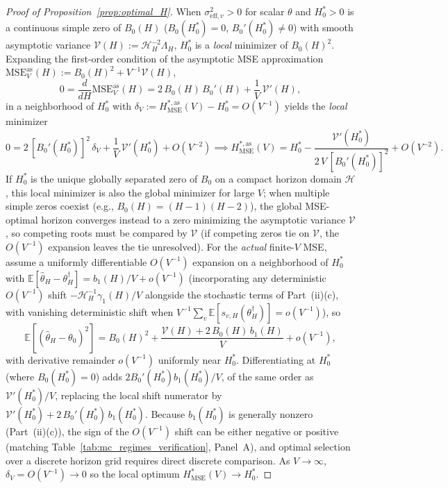 \begin{proof}[Proof of Proposition~\ref{prop:optimal_H}]
When $\sigma_{\mathrm{eff},v}^2 > 0$ for scalar $\theta$ and $H_0^\ast > 0$ is a continuous simple zero of $B_0(H)$ ($B_0(H_0^\ast) = 0$, $B_0'(H_0^\ast) \neq 0$) with smooth asymptotic variance $\mathcal{V}(H) := \mathcal{H}_H^{-2}\Lambda_H$, $H_0^\ast$ is a \emph{local} minimizer of $B_0(H)^2$. Expanding the first-order condition of the asymptotic MSE approximation $\mathrm{MSE}_V^{\mathrm{as}}(H) := B_0(H)^2 + V^{-1}\mathcal{V}(H)$,
\[
0 = \frac{d}{dH}\mathrm{MSE}_V^{\mathrm{as}}(H)
= 2\,B_0(H)\,B_0'(H) + \frac{1}{V}\,\mathcal{V}'(H),
\]
in a neighborhood of $H_0^\ast$ with $\delta_V := H_{\mathrm{MSE}}^{\ast,\mathrm{as}}(V) - H_0^\ast = O(V^{-1})$ yields the \emph{local} minimizer
\[
0 = 2\,[B_0'(H_0^\ast)]^2\,\delta_V + \frac{1}{V}\,\mathcal{V}'(H_0^\ast) + O(V^{-2})
\implies
H_{\mathrm{MSE}}^{\ast,\mathrm{as}}(V) = H_0^\ast - \frac{\mathcal{V}'(H_0^\ast)}{2\,V\,[B_0'(H_0^\ast)]^2} + O(V^{-2}).
\]
If $H_0^\ast$ is the unique globally separated zero of $B_0$ on a compact horizon domain $\mathcal{H}$, this local minimizer is also the global minimizer for large $V$; when multiple simple zeros coexist (e.g., $B_0(H) = (H-1)(H-2)$), the global MSE-optimal horizon converges instead to a zero minimizing the asymptotic variance $\mathcal{V}$, so competing roots must be compared by $\mathcal{V}$ (if competing zeros tie on $\mathcal{V}$, the $O(V^{-1})$ expansion leaves the tie unresolved).
For the \emph{actual} finite-$V$ MSE, assume a uniformly differentiable $O(V^{-1})$ expansion on a neighborhood of $H_0^\ast$ with $\mathbb{E}[\hat\theta_H - \theta_H^\dagger] = b_1(H)/V + o(V^{-1})$ (incorporating any deterministic $O(V^{-1})$ shift $-\mathcal{H}_H^{-1}\gamma_1(H)/V$ alongside the stochastic terms of Part~(ii)(c), with vanishing deterministic shift when $V^{-1}\sum_v\mathbb{E}[s_{v,H}(\theta_H^\dagger)] = o(V^{-1})$), so
\[
\mathbb{E}\!\left[(\hat\theta_H - \theta_0)^2\right]
= B_0(H)^2 + \frac{\mathcal{V}(H) + 2\,B_0(H)\,b_1(H)}{V} + o(V^{-1}),
\]
with derivative remainder $o(V^{-1})$ uniformly near $H_0^\ast$. Differentiating at $H_0^\ast$ (where $B_0(H_0^\ast)=0$) adds $2 B_0'(H_0^\ast) b_1(H_0^\ast)/V$, of the same order as $\mathcal{V}'(H_0^\ast)/V$, replacing the local shift numerator by $\mathcal{V}'(H_0^\ast) + 2\,B_0'(H_0^\ast)\,b_1(H_0^\ast)$. Because $b_1(H_0^\ast)$ is generally nonzero (Part~(ii)(c)), the sign of the $O(V^{-1})$ shift can be either negative or positive (matching Table~\ref{tab:mc_regimes_verification}, Panel~A), and optimal selection over a discrete horizon grid requires direct discrete comparison. As $V \to \infty$, $\delta_V = O(V^{-1}) \to 0$ so the local optimum $H_{\mathrm{MSE}}^\ast(V) \to H_0^\ast$.


\end{proof}
